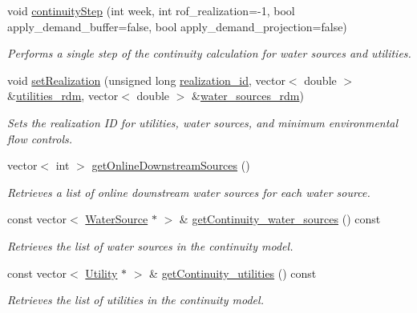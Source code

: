 \begin{DoxyCompactItemize}
void \mbox{\hyperlink{classContinuityModel_a7c37fec30b6381ded6150df1b1746953}{continuity\+Step}} (int week, int rof\+\_\+realization=-\/1, bool apply\+\_\+demand\+\_\+buffer=false, bool apply\+\_\+demand\+\_\+projection=false)
\begin{DoxyCompactList}\small\item\em Performs a single step of the continuity calculation for water sources and utilities. \end{DoxyCompactList}\item 
void \mbox{\hyperlink{classContinuityModel_a47504c599955b8193ffab3bd0f328144}{set\+Realization}} (unsigned long \mbox{\hyperlink{classContinuityModel_a7b6c99bf256f6c6b633ebb78282f43c7}{realization\+\_\+id}}, vector$<$ double $>$ \&\mbox{\hyperlink{classContinuityModel_aa4a00b76da6295d2faa11e3dcaea1896}{utilities\+\_\+rdm}}, vector$<$ double $>$ \&\mbox{\hyperlink{classContinuityModel_ab7b8fa93a6f56b328e425e1ead6cfefa}{water\+\_\+sources\+\_\+rdm}})
\begin{DoxyCompactList}\small\item\em Sets the realization ID for utilities, water sources, and minimum environmental flow controls. \end{DoxyCompactList}\item 
vector$<$ int $>$ \mbox{\hyperlink{classContinuityModel_a5682041c22910f1b2a79f30ba56a290d}{get\+Online\+Downstream\+Sources}} ()
\begin{DoxyCompactList}\small\item\em Retrieves a list of online downstream water sources for each water source. \end{DoxyCompactList}\item 
const vector$<$ \mbox{\hyperlink{classWaterSource}{Water\+Source}} $\ast$ $>$ \& \mbox{\hyperlink{classContinuityModel_aa0fbc434152c2ca4fc5e9534fa428de7}{get\+Continuity\+\_\+water\+\_\+sources}} () const
\begin{DoxyCompactList}\small\item\em Retrieves the list of water sources in the continuity model. \end{DoxyCompactList}\item 
const vector$<$ \mbox{\hyperlink{classUtility}{Utility}} $\ast$ $>$ \& \mbox{\hyperlink{classContinuityModel_ac95d9ee421dee12258643c4b7e5caa5d}{get\+Continuity\+\_\+utilities}} () const
\begin{DoxyCompactList}\small\item\em Retrieves the list of utilities in the continuity model. \end{DoxyCompactList}\end{DoxyCompactItemize}
